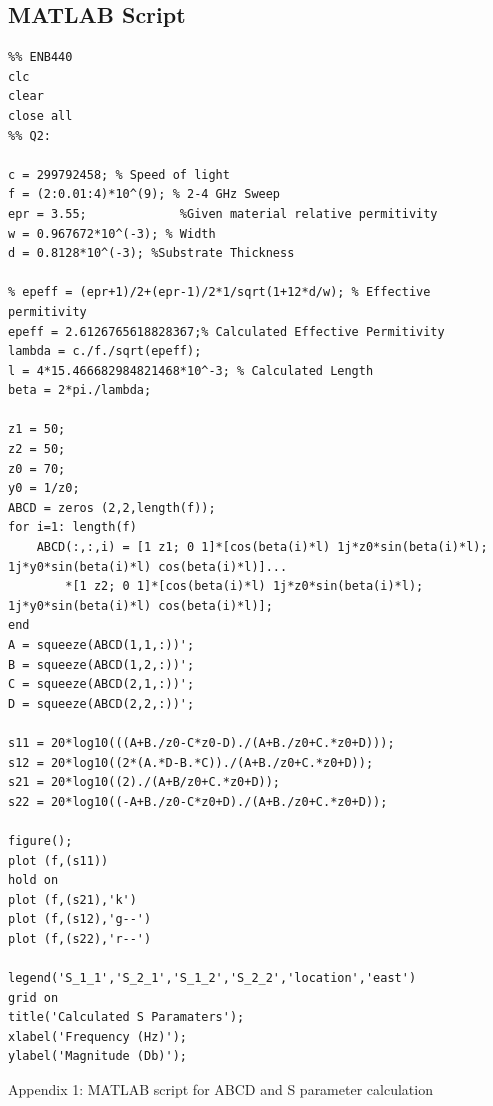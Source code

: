 \documentclass{paper}
\begin{document}
\subsection{MATLAB Script}
\begin{lstlisting}
%% ENB440
clc
clear
close all
%% Q2:

c = 299792458; % Speed of light
f = (2:0.01:4)*10^(9); % 2-4 GHz Sweep
epr = 3.55;             %Given material relative permitivity
w = 0.967672*10^(-3); % Width
d = 0.8128*10^(-3); %Substrate Thickness

% epeff = (epr+1)/2+(epr-1)/2*1/sqrt(1+12*d/w); % Effective permitivity
epeff = 2.6126765618828367;% Calculated Effective Permitivity
lambda = c./f./sqrt(epeff);
l = 4*15.466682984821468*10^-3; % Calculated Length
beta = 2*pi./lambda;

z1 = 50;
z2 = 50;
z0 = 70;
y0 = 1/z0;
ABCD = zeros (2,2,length(f));
for i=1: length(f)
    ABCD(:,:,i) = [1 z1; 0 1]*[cos(beta(i)*l) 1j*z0*sin(beta(i)*l); 1j*y0*sin(beta(i)*l) cos(beta(i)*l)]...
        *[1 z2; 0 1]*[cos(beta(i)*l) 1j*z0*sin(beta(i)*l); 1j*y0*sin(beta(i)*l) cos(beta(i)*l)];
end
A = squeeze(ABCD(1,1,:))';
B = squeeze(ABCD(1,2,:))';
C = squeeze(ABCD(2,1,:))';
D = squeeze(ABCD(2,2,:))';

s11 = 20*log10(((A+B./z0-C*z0-D)./(A+B./z0+C.*z0+D)));
s12 = 20*log10((2*(A.*D-B.*C))./(A+B./z0+C.*z0+D));
s21 = 20*log10((2)./(A+B/z0+C.*z0+D));
s22 = 20*log10((-A+B./z0-C*z0+D)./(A+B./z0+C.*z0+D));

figure();
plot (f,(s11))
hold on
plot (f,(s21),'k')
plot (f,(s12),'g--')
plot (f,(s22),'r--')

legend('S_1_1','S_2_1','S_1_2','S_2_2','location','east')
grid on
title('Calculated S Paramaters');
xlabel('Frequency (Hz)');
ylabel('Magnitude (Db)');
\end{lstlisting}
Appendix 1: MATLAB script for ABCD and S parameter calculation
\end{document}

